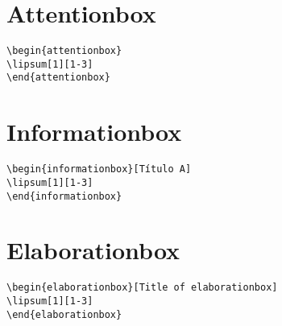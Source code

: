 \section{Attentionbox}

\lipsum[1][1-3]
\begin{highlightbox}
\begin{verbatim}
\begin{attentionbox}
\lipsum[1][1-3] 
\end{attentionbox}
\end{verbatim}
\end{highlightbox}
\begin{attentionbox}
\lipsum[1][1-3] 
\end{attentionbox}



\section{Informationbox}

\lipsum[1][1-3]
\begin{highlightbox}
\begin{verbatim}
\begin{informationbox}[Título A]
\lipsum[1][1-3]
\end{informationbox}
\end{verbatim}
\end{highlightbox}
\begin{informationbox}[Título A]
\lipsum[1][1-3]
\end{informationbox}


\section{Elaborationbox}

\lipsum[1][1-3]
\begin{highlightbox}
\begin{verbatim}
\begin{elaborationbox}[Title of elaborationbox]
\lipsum[1][1-3]
\end{elaborationbox}
\end{verbatim}
\end{highlightbox}
\begin{elaborationbox}
\lipsum[1][1-3]
\end{elaborationbox}


